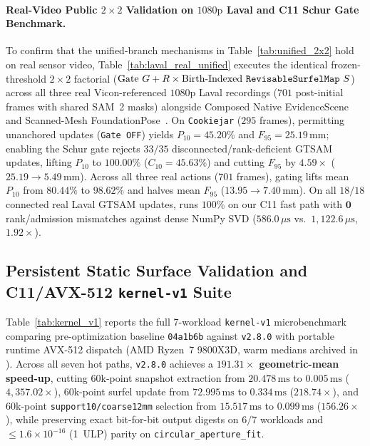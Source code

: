 \documentclass{evidencescene}
\begin{document}
\paragraph{Real-Video Public $2\times 2$ Validation on $1080\mathrm{p}$ Laval and C11 Schur Gate Benchmark.} To confirm that the unified-branch mechanisms in Table~\ref{tab:unified_2x2} hold on real sensor video, Table~\ref{tab:laval_real_unified} executes the identical frozen-threshold $2\times 2$ factorial ($\text{Gate }G+R\times\text{Birth-Indexed \texttt{RevisableSurfelMap} }S$) across all three real Vicon-referenced $1080\mathrm{p}$ Laval recordings ($701$ post-initial frames with shared SAM~2 masks) alongside Composed Native EvidenceScene and Scanned-Mesh FoundationPose~\cite{foundationpose}. On \texttt{Cookiejar} ($295$ frames), permitting unanchored updates (\texttt{Gate OFF}) yields $P_{10}=45.20\%$ and $F_{95}=25.19\,\mathrm{mm}$; enabling the Schur gate rejects $33/35$ disconnected/rank-deficient GTSAM updates, lifting $P_{10}$ to $\mathbf{100.00\%}$ ($C_{10}=45.63\%$) and cutting $F_{95}$ by $\mathbf{4.59\times}$ ($25.19\to\mathbf{5.49\,\mathrm{mm}}$). Across all three real actions ($701$ frames), gating lifts mean $P_{10}$ from $80.44\%$ to $\mathbf{98.62\%}$ and halves mean $F_{95}$ ($13.95\to\mathbf{7.40\,\mathrm{mm}}$). On all $18/18$ connected real Laval GTSAM updates,  runs $100\%$ on our C11 fast path with $\mathbf{0}$ rank/admission mismatches against dense NumPy SVD ($586.0\,\mu\mathrm{s}$ vs.\ $1{,}122.6\,\mu\mathrm{s}$, $\mathbf{1.92\times}$).



\subsection{Persistent Static Surface Validation and C11/AVX-512 \texttt{kernel-v1} Suite}
\label{sec:exp_v28}
Table~\ref{tab:kernel_v1} reports the full 7-workload \texttt{kernel-v1} microbenchmark comparing pre-optimization baseline \texttt{04a1b6b} against \texttt{v2.8.0} with portable runtime AVX-512 dispatch (AMD Ryzen~7 9800X3D, warm medians archived in ). Across all seven hot paths, \texttt{v2.8.0} achieves a \textbf{$191.31\times$ geometric-mean speed-up}, cutting 60k-point snapshot extraction from $20.478\,\mathrm{ms}$ to $\mathbf{0.005\,\mathrm{ms}}$ ($4{,}357.02\times$), 60k-point surfel update from $72.995\,\mathrm{ms}$ to $\mathbf{0.334\,\mathrm{ms}}$ ($218.74\times$), and 60k-point \texttt{support10/coarse12mm} selection from $15.517\,\mathrm{ms}$ to $\mathbf{0.099\,\mathrm{ms}}$ ($156.26\times$), while preserving exact bit-for-bit output digests on $6/7$ workloads and $\le 1.6\times 10^{-16}$ (1~ULP) parity on \texttt{circular\_aperture\_fit}.
\end{document}

